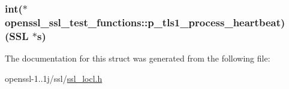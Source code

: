 \hypertarget{structopenssl__ssl__test__functions_ac585c578d8f9c1098a995cdfe0b377ef}{
\subsubsection[{p\-\_\-tls1\-\_\-process\-\_\-heartbeat}]{\setlength{\rightskip}{0pt plus 5cm}int($\ast$ openssl\-\_\-ssl\-\_\-test\-\_\-functions\-::p\-\_\-tls1\-\_\-process\-\_\-heartbeat)(S\-S\-L $\ast$s)}}\label{structopenssl__ssl__test__functions_ac585c578d8f9c1098a995cdfe0b377ef}


The documentation for this struct was generated from the following file\-:\begin{DoxyCompactItemize}
\item 
openssl-\/1..\-1j/ssl/\hyperlink{ssl__locl_8h}{ssl\-\_\-locl.\-h}\end{DoxyCompactItemize}
